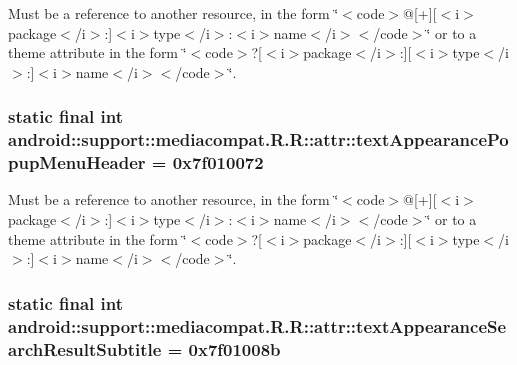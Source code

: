 Must be a reference to another resource, in the form \char`\"{}$<$code$>$@\mbox{[}+\mbox{]}\mbox{[}$<$i$>$package$<$/i$>$:\mbox{]}$<$i$>$type$<$/i$>$:$<$i$>$name$<$/i$>$$<$/code$>$\char`\"{} or to a theme attribute in the form \char`\"{}$<$code$>$?\mbox{[}$<$i$>$package$<$/i$>$:\mbox{]}\mbox{[}$<$i$>$type$<$/i$>$:\mbox{]}$<$i$>$name$<$/i$>$$<$/code$>$\char`\"{}. \hypertarget{classandroid_1_1support_1_1mediacompat_1_1_r_1_1attr_11833ad1ce91fff7bdd6cdc35a177c8f}{
\subsubsection[{textAppearancePopupMenuHeader}]{\setlength{\rightskip}{0pt plus 5cm}static final int android::support::mediacompat.R.R::attr::textAppearancePopupMenuHeader = 0x7f010072}}
\label{classandroid_1_1support_1_1mediacompat_1_1_r_1_1attr_11833ad1ce91fff7bdd6cdc35a177c8f}


Must be a reference to another resource, in the form \char`\"{}$<$code$>$@\mbox{[}+\mbox{]}\mbox{[}$<$i$>$package$<$/i$>$:\mbox{]}$<$i$>$type$<$/i$>$:$<$i$>$name$<$/i$>$$<$/code$>$\char`\"{} or to a theme attribute in the form \char`\"{}$<$code$>$?\mbox{[}$<$i$>$package$<$/i$>$:\mbox{]}\mbox{[}$<$i$>$type$<$/i$>$:\mbox{]}$<$i$>$name$<$/i$>$$<$/code$>$\char`\"{}. \hypertarget{classandroid_1_1support_1_1mediacompat_1_1_r_1_1attr_9a8348191170e2bae96de29349c29e7a}{
\subsubsection[{textAppearanceSearchResultSubtitle}]{\setlength{\rightskip}{0pt plus 5cm}static final int android::support::mediacompat.R.R::attr::textAppearanceSearchResultSubtitle = 0x7f01008b}}
\label{classandroid_1_1support_1_1mediacompat_1_1_r_1_1attr_9a8348191170e2bae96de29349c29e7a}


